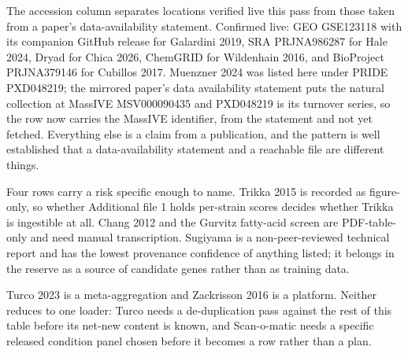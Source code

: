  The accession column separates
locations verified live this pass from those taken from a paper's data-availability
statement. Confirmed live: GEO GSE123118 with its companion GitHub release for
Galardini 2019, SRA PRJNA986287 for Hale 2024, Dryad for Chica 2026, ChemGRID for
Wildenhain 2016, and BioProject PRJNA379146 for Cubillos 2017. Muenzner 2024 was listed
here under PRIDE PXD048219; the mirrored paper's data availability statement puts the
natural collection at MassIVE MSV000090435 and PXD048219 is its turnover series, so the
row now carries the MassIVE identifier, from the statement and not yet fetched.
Everything else is a claim from a publication, and the pattern is well established that a
data-availability statement and a reachable file are different things.

Four rows carry a risk specific enough to name. Trikka 2015 is recorded as figure-only, so
whether Additional file 1 holds per-strain scores decides whether Trikka is ingestible at
all. Chang 2012 and the Gurvitz fatty-acid screen are PDF-table-only and need manual
transcription. Sugiyama is a non-peer-reviewed technical report and has the lowest
provenance confidence of anything listed; it belongs in the reserve as a source of candidate
genes rather than as training data.

 Turco 2023 is a meta-aggregation and Zackrisson
2016 is a platform. Neither reduces to one loader: Turco needs a de-duplication pass against
the rest of this table before its net-new content is known, and Scan-o-matic needs a
specific released condition panel chosen before it becomes a row rather than a plan.

